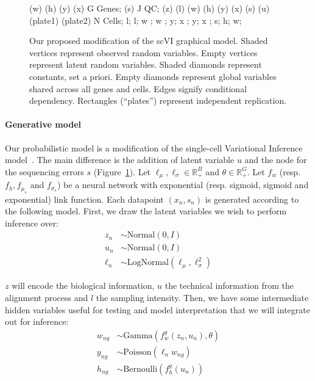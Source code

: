 \begin{figure}[h]
{{     {(w) (h) (y) (x)} {G} {Genes}; %
     {(s)} {J} {QC};
    {(z) (l) (w) (h) (y) (x) (s) (u) (plate1) (plate2)} {N} {Cells}; %
     {l};
     {l};
     {w} ;
     {w} ; %
     {y};
     {x} ; %
     {y}; %
     {x} ; %
     {s};
     {h};
     {w};
  }
  }
\caption[Our proposed modification of the scVI graphical model]{Our proposed modification of the scVI graphical model. Shaded vertices represent observed random variables. Empty vertices represent latent random variables. Shaded diamonds represent constants, set a priori. Empty diamonds represent global variables shared across all genes and cells. Edges signify conditional dependency. Rectangles (``plates'') represent independent replication. }
\label{hsicgraph}
\end{figure}

\paragraph{Generative model}
Our probabilistic model is a modification of the single-cell Variational Inference model~\cite{Lopez292037}. The main difference is the addition of latent variable $u$ and the node for the sequencing errors $s$ (Figure~\ref{hsicgraph}). Let $\ell_\mu, \ell_\sigma \in \mathbb{R}_+^B$ and $\theta \in \mathbb{R}_+^G$. Let $f_w$ (resp. $f_h, f_{\mu_s}$ and $f_{\sigma_s}$) be a neural network with exponential (resp. sigmoid, sigmoid and exponential) link function. Each datapoint $(x_n, s_n)$ is generated according to the following model. First, we draw the latent variables we wish to perform inference over:
\begin{align}
	z_n &\sim \textrm{Normal}(0, I) \\
    u_n &\sim \textrm{Normal}(0, I) \\
    \ell_n &\sim \textrm{LogNormal}(\ell_\mu, \ell_\sigma^2) 
\end{align}

$z$ will encode the biological information, $u$ the technical information from the alignment process and $l$ the sampling intensity. Then, we have some intermediate hidden variables useful for testing and model interpretation that we will integrate out for inference:
\begin{align}
    w_{ng} &\sim \textrm{Gamma}(f_w^g(z_n, u_n), \theta) \\
    y_{ng} &\sim \textrm{Poisson}( \ell_n w_{ng}) \\
    h_{ng} &\sim \textrm{Bernoulli}(f_h^g(u_n)) 
\end{align}

